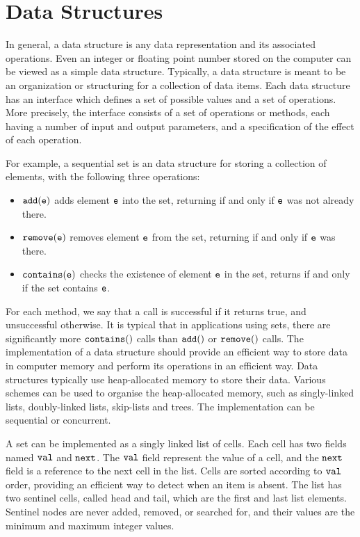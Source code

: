  
\chapter{Data Structures}
In general, a data structure is any data representation and its
associated operations. Even an integer or floating point number stored on the computer can be viewed as a simple data structure. Typically, a data structure is meant to be an organization or structuring for a collection of data items. 
 Each data structure has an interface which defines a set of possible values and a set of operations. More precisely, the interface consists of a set of operations or methods, each having a number of input and output parameters, and a specification of the effect of each operation. 

For example,  a sequential set is an data structure for storing a collection of elements, with the following three operations: 
\begin{itemize}
\item $\tt add(e)$ adds element $\tt e$ into the set, returning \true\; if and only if $\tt e$ was not
already there. 
\item $\tt remove(e)$ removes element $\tt e$ from the set, returning \true\; if and only if
$\tt e$ was there. 
\item $\tt contains(e)$ checks the existence of element $\tt e$ in the set, returns \true\; if and only if the set contains $\tt e$. 
\end{itemize}
For each method, we say that a call is successful if it returns true, and unsuccessful
otherwise. It is typical that in applications using sets, there are significantly more
$\tt contains()$ calls than $\tt add()$ or $\tt remove()$ calls.
The implementation of a data structure should provide
an efficient way to store data in computer memory and perform its operations
in an efficient way. Data structures
typically use heap-allocated memory to store their data. Various schemes
can be used to organise the heap-allocated memory, such as singly-linked lists,
doubly-linked lists, skip-lists and trees. The implementation
can be sequential or concurrent.

A set can be implemented as a singly linked list of cells. Each cell has two fields named $\tt val$ and $\tt next$. The $\tt val$ field represent the value of a cell, and the $\tt next$ field is a reference to
the next cell in the list. Cells are sorted according to $\tt val$ order, providing an efficient way to detect when an item is absent. The list has two sentinel cells, called head and tail, which are the first and last list elements. Sentinel nodes are never added, removed, or searched for, and their values are the minimum and maximum integer values.



